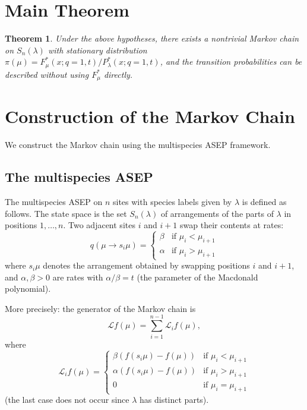 \documentclass[12pt]{article}
\newtheorem{theorem}{Theorem}
\begin{document}
\section{Main Theorem}

\begin{theorem}\label{thm:main}
Under the above hypotheses, there exists a nontrivial Markov chain on $S_n(\lambda)$ with stationary distribution $\pi(\mu) = F^*_\mu(x; q{=}1, t) / P^*_\lambda(x; q{=}1, t)$, and the transition probabilities can be described without using $F^*_\mu$ directly.
\end{theorem}

\section{Construction of the Markov Chain}

We construct the Markov chain using the multispecies ASEP framework.

\subsection{The multispecies ASEP}

The multispecies ASEP on $n$ sites with species labels given by $\lambda$ is defined as follows. The state space is the set $S_n(\lambda)$ of arrangements of the parts of $\lambda$ in positions $1, \ldots, n$. Two adjacent sites $i$ and $i+1$ swap their contents at rates:
\[
q(\mu \to s_i \mu) = \begin{cases} \beta & \text{if } \mu_i < \mu_{i+1} \\ \alpha & \text{if } \mu_i > \mu_{i+1} \end{cases}
\]
where $s_i \mu$ denotes the arrangement obtained by swapping positions $i$ and $i+1$, and $\alpha, \beta > 0$ are rates with $\alpha / \beta = t$ (the parameter of the Macdonald polynomial).

More precisely: the generator of the Markov chain is
\begin{equation}\label{eq:generator}
\mathcal{L} f(\mu) = \sum_{i=1}^{n-1} \mathcal{L}_i f(\mu),
\end{equation}
where
\[
\mathcal{L}_i f(\mu) = \begin{cases}
\beta (f(s_i \mu) - f(\mu)) & \text{if } \mu_i < \mu_{i+1} \\
\alpha (f(s_i \mu) - f(\mu)) & \text{if } \mu_i > \mu_{i+1} \\
0 & \text{if } \mu_i = \mu_{i+1}
\end{cases}
\]
(the last case does not occur since $\lambda$ has distinct parts).
\end{document}

